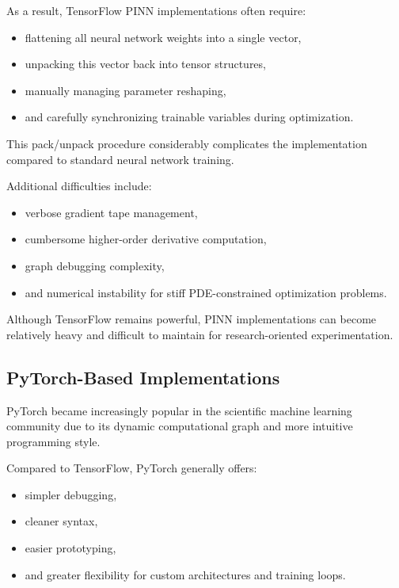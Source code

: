 As a result, TensorFlow PINN implementations often require:
\begin{itemize}
    \item flattening all neural network weights into a single vector,
    \item unpacking this vector back into tensor structures,
    \item manually managing parameter reshaping,
    \item and carefully synchronizing trainable variables during optimization.
\end{itemize}

This pack/unpack procedure considerably complicates the implementation compared to standard neural network training.

Additional difficulties include:
\begin{itemize}
    \item verbose gradient tape management,
    \item cumbersome higher-order derivative computation,
    \item graph debugging complexity,
    \item and numerical instability for stiff PDE-constrained optimization problems.
\end{itemize}

Although TensorFlow remains powerful, PINN implementations can become relatively heavy and difficult to maintain for research-oriented experimentation.

\subsection{PyTorch-Based Implementations}

PyTorch became increasingly popular in the scientific machine learning community due to its dynamic computational graph and more intuitive programming style.

Compared to TensorFlow, PyTorch generally offers:
\begin{itemize}
    \item simpler debugging,
    \item cleaner syntax,
    \item easier prototyping,
    \item and greater flexibility for custom architectures and training loops.
\end{itemize}

